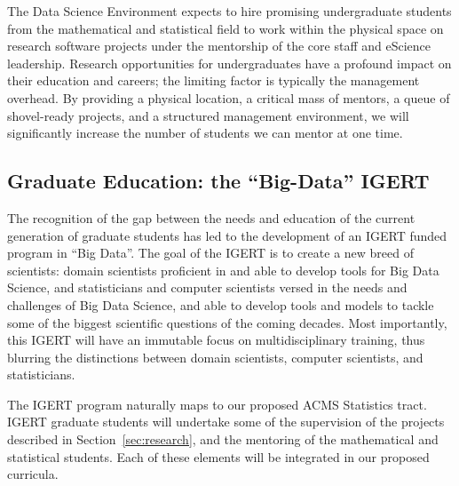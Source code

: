 The Data Science Environment expects to hire promising undergraduate students from the mathematical and statistical field to work within the physical space on research software projects under the mentorship of the core staff and eScience leadership.  Research opportunities for undergraduates have a profound impact on their education and careers; the limiting factor is typically the management overhead.  By providing a physical location, a critical mass of mentors, a queue of shovel-ready projects, and a structured management environment, we will significantly increase the number of students we can mentor at one time.

\subsection{Graduate Education: the ``Big-Data'' IGERT}


The recognition of the gap between the needs and education of the current generation of graduate students has led to the development of an IGERT funded program in ``Big Data''.  The goal of the IGERT is to create a new breed of scientists: domain scientists proficient in and able to develop tools for Big Data Science, and statisticians and computer scientists versed in the needs and challenges of Big Data Science, and able to develop tools and models to tackle some of the biggest scientific questions of the coming decades.  Most importantly, this IGERT will have an immutable focus on multidisciplinary training, thus blurring the distinctions between domain scientists, computer scientists, and statisticians.

The IGERT program naturally maps to our proposed ACMS Statistics tract. IGERT graduate students will undertake some of the supervision of the projects described in Section~\ref{sec:research}, and the mentoring of the mathematical and statistical students. Each of these elements will be integrated in our proposed curricula. 
